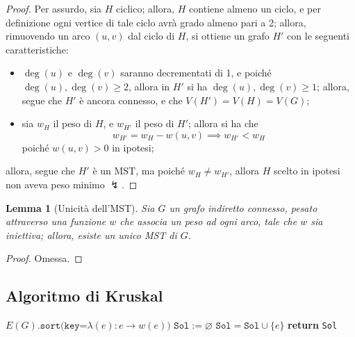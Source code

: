 \documentclass[14pt]{extreport}
\newtheorem{lemma}{Lemma}[subsection]
\theoremstyle{definition}
\theoremstyle{definition}
\begin{document}
\begin{proof}
    Per assurdo, sia $H$ ciclico; allora, $H$ contiene almeno un ciclo, e per definizione ogni vertice di tale ciclo avrà grado almeno pari a 2; allora, rimuovendo un arco $(u, v)$ dal ciclo di $H$, si ottiene un grafo $H'$ con le seguenti caratteristiche:

    \begin{itemize}
        \item $\deg(u)$ e $\deg(v)$ saranno decrementati di 1, e poiché $\deg(u), \deg(v) \ge 2$, allora in $H'$ si ha $\deg(u), \deg(v) \ge 1$; allora, segue che $H'$ è ancora connesso, e che $V(H') = V(H) = V(G)$;
        \item sia $w_H$ il peso di $H$, e $w_{H'}$ il peso di $H'$; allora si ha che $$w_{H'} = w_H - w(u, v) \implies w_{H'} < w_H$$ poiché $w(u, v) > 0$ in ipotesi;
    \end{itemize}

    allora, segue che $H'$ è un MST, ma poiché $w_H \neq w_{H'}$, allora $H$ scelto in ipotesi non aveva peso minimo $\lightning$.
\end{proof}

\begin{lemma}[Unicità dell'MST]
    Sia $G$ un grafo indiretto connesso, pesato attraverso una funzione $w$ che associa un peso ad ogni arco, tale che $w$ sia iniettiva; allora, esiste un unico MST di $G$.
\end{lemma}

\begin{proof}
    Omessa.
\end{proof}

\subsection{Algoritmo di Kruskal}

\begin{algorithm}[H]
    \caption{
        Dato un grafo indiretto connesso $G$, pesato attraverso $w$ con pesi strettamente positivi, l'algoritmo ne restituisce un MST.\\
        \textbf{Input}: $G$ grafo indiretto connesso; $w$ una funzione che associa pesi, strettamente positivi, agli archi in $E(G)$.\\
        \textbf{Output}: un MST di $G$.
    }

    \begin{algorithmic}[1]
            \State $E(G)\texttt{.sort(key=}\lambda (e): e \rightarrow w(e)\texttt{)}$ 
            \State $\texttt{Sol}:= \varnothing$
             
                    \State $\texttt{Sol} = \texttt{Sol} \cup \{e\}$
                \EndIf
            \EndFor
            \State \textbf{return} \texttt{Sol}
        \EndFunction
    \end{algorithmic}
\end{algorithm}
\end{document}
